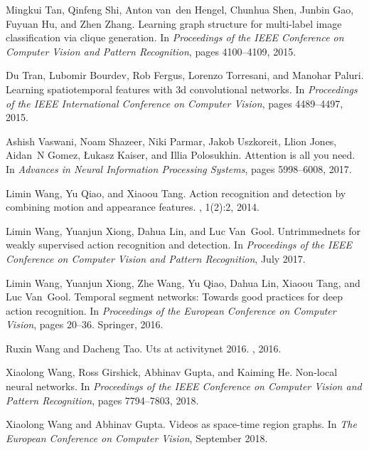 \documentclass[10pt,twocolumn,letterpaper]{article}
\begin{document}
\begin{thebibliography}{10}
	Mingkui Tan, Qinfeng Shi, Anton van~den Hengel, Chunhua Shen, Junbin Gao,
	Fuyuan Hu, and Zhen Zhang.
	\newblock Learning graph structure for multi-label image classification via
	clique generation.
	\newblock In {\em Proceedings of the IEEE Conference on Computer Vision and
		Pattern Recognition}, pages 4100--4109, 2015.
	
	Du Tran, Lubomir Bourdev, Rob Fergus, Lorenzo Torresani, and Manohar Paluri.
	\newblock Learning spatiotemporal features with 3d convolutional networks.
	\newblock In {\em Proceedings of the IEEE International Conference on Computer
		Vision}, pages 4489--4497, 2015.
	
	Ashish Vaswani, Noam Shazeer, Niki Parmar, Jakob Uszkoreit, Llion Jones,
	Aidan~N Gomez, {\L}ukasz Kaiser, and Illia Polosukhin.
	\newblock Attention is all you need.
	\newblock In {\em Advances in Neural Information Processing Systems}, pages
	5998--6008, 2017.
	
	Limin Wang, Yu Qiao, and Xiaoou Tang.
	\newblock Action recognition and detection by combining motion and appearance
	features.
	, 1(2):2, 2014.
	
	Limin Wang, Yuanjun Xiong, Dahua Lin, and Luc Van~Gool.
	\newblock Untrimmednets for weakly supervised action recognition and detection.
	\newblock In {\em Proceedings of the IEEE Conference on Computer Vision and
		Pattern Recognition}, July 2017.
	
	Limin Wang, Yuanjun Xiong, Zhe Wang, Yu Qiao, Dahua Lin, Xiaoou Tang, and Luc
	Van~Gool.
	\newblock Temporal segment networks: Towards good practices for deep action
	recognition.
	\newblock In {\em Proceedings of the European Conference on Computer Vision},
	pages 20--36. Springer, 2016.
	
	Ruxin Wang and Dacheng Tao.
	\newblock Uts at activitynet 2016.
	, 2016.
	
	Xiaolong Wang, Ross Girshick, Abhinav Gupta, and Kaiming He.
	\newblock Non-local neural networks.
	\newblock In {\em Proceedings of the IEEE Conference on Computer Vision and
		Pattern Recognition}, pages 7794--7803, 2018.
	
	Xiaolong Wang and Abhinav Gupta.
	\newblock Videos as space-time region graphs.
	\newblock In {\em The European Conference on Computer Vision}, September 2018.
	

\end{thebibliography}
\end{document}
